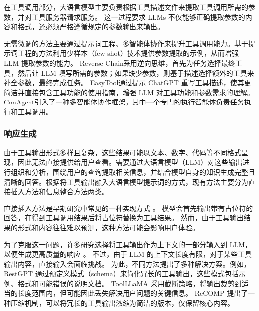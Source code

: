 在工具调用部分，大语言模型主要负责根据工具描述文件来提取工具调用所需的参数，并对工具服务器请求服务。
这一过程要求 LLMs 不仅能够正确提取参数的内容和格式，还必须严格遵循规定的参数输出来输出。

无需微调的方法主要通过提示词工程、多智能体协作来提升工具调用能力。基于提示词工程的方法利用少样本（few-shot）技术提供参数提取的示例，从而增强 LLM 提取参数的能力\cite{Song2023, Liu2023a, Liu2024, hsieh2023tool}。
Reverse Chain\cite{zhang2023reverse}采用逆向思维，首先为任务选择最终工具，然后让 LLM 填写所需的参数；如果缺少参数，则基于描述选择额外的工具来补全参数，最终完成任务。
EasyTool\cite{yuan2024easytool}通过提示 ChatGPT 重写工具描述，使其更简洁并直接包含工具功能的使用指南，增强 LLM 对工具功能和参数需求的理解。
ConAgent\cite{shi2024learning}引入了一种多智能体协作框架，其中一个专门的执行智能体负责任务执行和工具调用。

\subsubsection{响应生成}

由于工具输出形式多样且复杂，这些结果可能以文本、数字、代码等不同格式呈现，因此无法直接提供给用户查看。需要通过大语言模型（LLM）对这些输出进行组织和分析，围绕用户的查询提取相关信息，并结合模型自身的知识生成完整且清晰的回答。根据将工具输出融入大语言模型提示词的方式，现有方法主要分为直接插入方法和信息整合方法两类。

直接插入方法是早期研究中常见的一种实现方式 \cite{schick2024toolformer, wang2024tools, hao2024toolkengpt}。
模型会首先输出带有占位符的回答，在得到工具调用结果后将占位符替换为工具结果。
然而，由于工具输出结果的形式和内容往往难以预测，这种方法可能会影响用户体验。

为了克服这一问题，许多研究选择将工具输出作为上下文的一部分输入到 LLM，以便生成更高质量的响应 \cite{shen2024hugginggpt,}。
不过，由于 LLM 的上下文长度有限，对于某些工具输出内容，直接输入会面临挑战。
为此，不同方法提出了多种解决方案。例如，RestGPT \cite{Song2023} 通过预定义模式（schema）来简化冗长的工具输出，这些模式包括示例、格式和可能错误的说明文档。
ToolLLaMA \cite{Qin2023} 采用截断策略，将输出裁剪到适当的长度范围内，但可能因此丢失解决用户问题的关键信息。
ReCOMP \cite{xu2023recomp} 提出了一种压缩机制，可以将冗长的工具输出浓缩为简洁的版本，仅保留核心内容。


